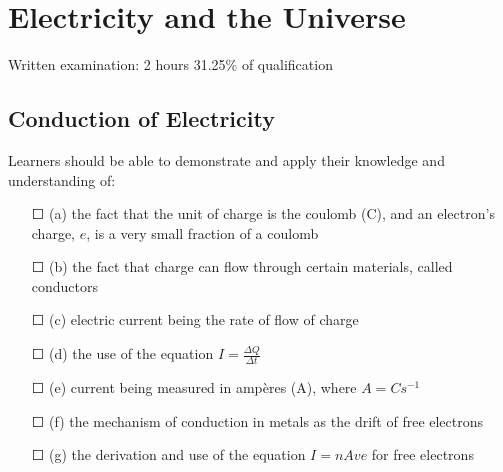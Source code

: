 \section{Electricity and the Universe}
Written examination: 2 hours
31.25\% of qualification
\subsection{Conduction of Electricity}Learners should be able to demonstrate and apply their knowledge and
understanding of:
\begin{itemize}
	\item[\Large{$\Square$}]	(a) the fact that the unit of charge is the coulomb (C), and \sq an electron's charge, $e$,	is a very small fraction of a coulomb
	\item[\Large{$\Square$}]	(b) the fact that charge can flow through certain materials, called conductors
	\item[\Large{$\Square$}]	(c) electric current being the rate of flow of charge
	\item[\Large{$\Square$}]	(d) the use of the equation \(I=\frac{\Delta Q}{\Delta t}\)
	\item[\Large{$\Square$}]	(e) current being measured in ampères (A), where $A = C s^{-1}$
	\item[\Large{$\Square$}]	(f) the mechanism of conduction in metals as the drift of free electrons
	\item[\Large{$\Square$}]	(g) the derivation and use of the equation $I = nAve$ for free electrons
\end{itemize}
